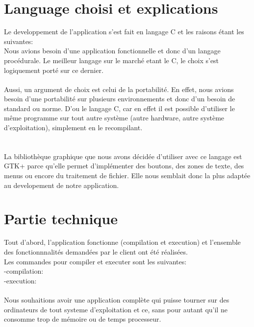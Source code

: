 \documentclass[a4]{article}
\begin{document}
	\section{Language choisi et explications}
	
	Le developpement de l'application s'est fait en langage C et les raisons étant les suivantes: \\
	
Nous avions besoin d'une application fonctionnelle et donc d'un langage procédurale. Le meilleur langage sur le marché
etant le C, le choix s'est logiquement porté sur ce dernier.\\ \\

Aussi, un argument de choix est celui de la portabilité. En effet, nous avions besoin d'une portabilité sur plusieurs
environnements et donc d'un besoin de standard ou norme. D'ou le langage C, car en effet il est possible d'utiliser
 le même programme sur tout autre système
 (autre hardware, autre système d'exploitation), simplement en le recompilant. \\ \\ \\



La bibliothèque graphique que nous avons décidée d'utiliser avec ce langage est GTK+ 
		parce qu'elle permet d'implémenter des boutons, des zones de texte, des menus ou encore du traitement de fichier.
		Elle nous semblait donc la plus adaptée au developement de notre application.
	\section{Partie technique}
	
	Tout d'abord, l'application fonctionne (compilation et execution) et
	l'ensemble des fonctionnnalités demandées par le client ont été réalisées.\\ 
	Les commandes pour compiler et executer sont les suivantes:\\
	-compilation:\\
	-execution:\\ \\
	
	
	Nous souhaitions avoir une application complète qui puisse tourner sur des ordinateurs 
de tout systeme d'exploitation et ce, sans pour autant qu’il ne
consomme trop de mémoire ou de temps processeur. \\ \\
	
\end{document}
